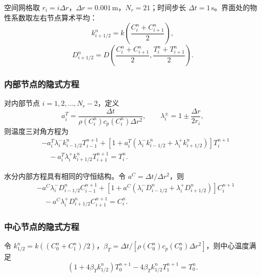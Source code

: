 \documentclass[withoutpreface,bwprint]{cumcm_thesis}
\begin{document}
空间网格取 \(r_i = i\Delta r\)，\(\Delta r = 0.001\,\text{m}\)，\(N_r = 21\)；时间步长 \(\Delta t = 1\,\text{s}\)。界面处的物性系数取左右节点算术平均：
\begin{equation}
k_{i+1/2}^n = k\left(\frac{C_i^n + C_{i+1}^n}{2}\right),
\end{equation}
\begin{equation}
D_{i+1/2}^n = D\left(\frac{C_i^n + C_{i+1}^n}{2}, \frac{T_i^n + T_{i+1}^n}{2}\right).
\end{equation}

\subsubsection{内部节点的隐式方程}

对内部节点 \(i = 1,2,\dots,N_r-2\)，定义
\begin{equation}
a_i^T = \frac{\Delta t}{\rho(C_i^n)c_p(C_i^n)\Delta r^2}, \qquad \lambda_i^\pm = 1 \pm \frac{\Delta r}{2r_i},
\end{equation}
则温度三对角方程为
\begin{equation}
\begin{aligned}
&-a_i^T \lambda_i^- k_{i-1/2}^n T_{i-1}^{n+1} + \left[1 + a_i^T\left(\lambda_i^- k_{i-1/2}^n + \lambda_i^+ k_{i+1/2}^n\right)\right]T_i^{n+1} \\
&\quad - a_i^T \lambda_i^+ k_{i+1/2}^n T_{i+1}^{n+1} = T_i^n.
\end{aligned}
\end{equation}

水分内部方程具有相同的守恒结构。令 \(a^C = \Delta t/\Delta r^2\)，则
\begin{equation}
\begin{aligned}
&-a^C \lambda_i^- D_{i-1/2}^n C_{i-1}^{n+1} + \left[1 + a^C\left(\lambda_i^- D_{i-1/2}^n + \lambda_i^+ D_{i+1/2}^n\right)\right]C_i^{n+1} \\
&\quad - a^C \lambda_i^+ D_{i+1/2}^n C_{i+1}^{n+1} = C_i^n.
\end{aligned}
\end{equation}

\subsubsection{中心节点的隐式方程}

令 \(k_{1/2}^n = k\left((C_0^n + C_1^n)/2\right)\)，\(\beta_T = \Delta t/[\rho(C_0^n)c_p(C_0^n)\Delta r^2]\)，则中心温度满足
\begin{equation}
\left(1 + 4\beta_T k_{1/2}^n\right)T_0^{n+1} - 4\beta_T k_{1/2}^n T_1^{n+1} = T_0^n.
\end{equation}
\end{document}

